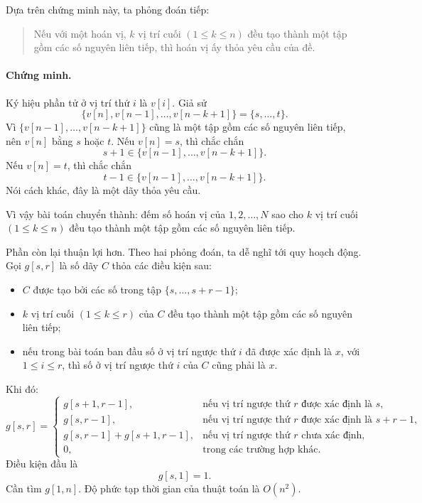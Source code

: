 \documentclass[11pt]{article}
\begin{document}
Dựa trên chứng minh này, ta phỏng đoán tiếp:

\begin{quote}
 Nếu với một hoán vị, \(k\) vị trí cuối
\((1\le k\le n)\) đều tạo thành một tập gồm các số nguyên liên tiếp, thì hoán
vị ấy thỏa yêu cầu của đề.
\end{quote}

\paragraph{Chứng minh.}
Ký hiệu phần tử ở vị trí thứ \(i\) là \(v[i]\). Giả sử
\[
  \{v[n],v[n-1],\ldots,v[n-k+1]\}=\{s,\ldots,t\}.
\]
Vì \(\{v[n-1],\ldots,v[n-k+1]\}\) cũng là một tập gồm các số nguyên liên
tiếp, nên \(v[n]\) bằng \(s\) hoặc \(t\). Nếu \(v[n]=s\), thì chắc chắn
\[
  s+1\in\{v[n-1],\ldots,v[n-k+1]\}.
\]
Nếu \(v[n]=t\), thì chắc chắn
\[
  t-1\in\{v[n-1],\ldots,v[n-k+1]\}.
\]
Nói cách khác, đây là một dãy thỏa yêu cầu.

Vì vậy bài toán chuyển thành: đếm số hoán vị của \(1,2,\ldots,N\) sao cho
\(k\) vị trí cuối \((1\le k\le n)\) đều tạo thành một tập gồm các số nguyên
liên tiếp.

Phần còn lại thuận lợi hơn. Theo hai phỏng đoán, ta dễ nghĩ tới quy hoạch
động. Gọi \(g[s,r]\) là số dãy \(C\) thỏa các điều kiện sau:
\begin{itemize}
  \item \(C\) được tạo bởi các số trong tập \(\{s,\ldots,s+r-1\}\);
  \item \(k\) vị trí cuối \((1\le k\le r)\) của \(C\) đều tạo thành một tập
  gồm các số nguyên liên tiếp;
  \item nếu trong bài toán ban đầu số ở vị trí ngược thứ \(i\) đã được xác
  định là \(x\), với \(1\le i\le r\), thì số ở vị trí ngược thứ \(i\) của
  \(C\) cũng phải là \(x\).
\end{itemize}
Khi đó:
\[
g[s,r]=
\begin{cases}
g[s+1,r-1], & \text{nếu vị trí ngược thứ } r \text{ được xác định là } s,\\
g[s,r-1], & \text{nếu vị trí ngược thứ } r \text{ được xác định là } s+r-1,\\
g[s,r-1]+g[s+1,r-1], & \text{nếu vị trí ngược thứ } r \text{ chưa xác định},\\
0, & \text{trong các trường hợp khác}.
\end{cases}
\]
Điều kiện đầu là
\[
  g[s,1]=1.
\]
Cần tìm \(g[1,n]\). Độ phức tạp thời gian của thuật toán là \(O(n^2)\).
\end{document}
